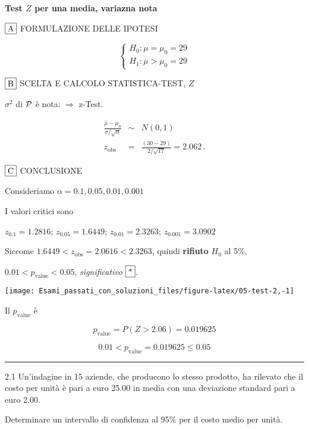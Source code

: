 \documentclass[
  11pt,
]{book}
\theoremstyle{mytheoremstyle}
\theoremstyle{mydefstyle}
\newenvironment{sol}
  {
  \begin{tcolorbox}[enhanced,breakable,arc=0.1mm,boxrule=1pt,colback=white,colframe=iblue,
  title=\bf \fontfamily{lmss}\selectfont \hspace{.5 cm} Soluzione,drop fuzzy shadow]

}{
\end{tcolorbox}
  }
\begin{document}
\begin{sol}
\textbf{Test \(Z\) per una media, variazna nota}

\(\fbox{A}\) FORMULAZIONE DELLE IPOTESI

\[\begin{cases}
   H_0: \mu = \mu_0=29 \\
   H_1: \mu > \mu_0=29 
   \end{cases}\]

\(\fbox{B}\) SCELTA E CALCOLO STATISTICA-TEST, \(Z\)

\(\sigma^{2}\) di \(\cal{P}\) è nota: \(\Rightarrow\) z-Test.

\begin{eqnarray*}
   \frac{\hat\mu - \mu_{0}} {\sigma/\sqrt{n}}&\sim&N(0,1)\\
   z_{\text{obs}}
   &=& \frac{ ( 30 -  29 )} { 2 /\sqrt{ 17 }}
   =   2.062 \, .
   \end{eqnarray*}

\(\fbox{C}\) CONCLUSIONE

Consideriamo \(\alpha=0.1, 0.05, 0.01, 0.001\)

I valori critici sono

\(z_{0.1}=1.2816\); \(z_{0.05}=1.6449\); \(z_{0.01}=2.3263\); \(z_{0.001}=3.0902\)

Siccome \(1.6449<z_\text{obs}=2.0616<2.3263\), quindi \textbf{rifiuto} \(H_0\) al 5\%,

\(0.01<p_\text{value}<0.05\), \emph{significativo} \(\fbox{*}\).

\begin{center}\texttt{[image: Esami\_passati\_con\_soluzioni\_files/figure-latex/05-test-2,-1]} \end{center}

Il \(p_{\text{value}}\) è

\[ p_{\text{value}} = P(Z>2.06)=0.019625 \]

\[
 0.01 < p_\text{value}= 0.019625 \leq 0.05 
\]

\end{sol}

\begin{center}\rule{0.5\linewidth}{0.5pt}\end{center}

2.1 Un'indagine in 15 aziende, che producono lo stesso prodotto,
ha rilevato che il costo per unità è pari a euro 25.00
in media con una deviazione standard pari a euro 2.00.

Determinare un intervallo di confidenza al 95\%
per il costo medio per unità.
\end{document}
